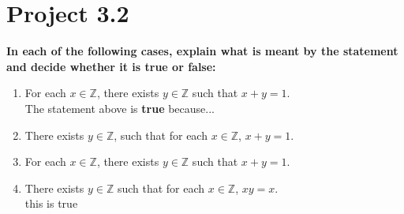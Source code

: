 \documentclass{article}
\begin{document}
\section{Project 3.2}
\textbf{In each of the following cases, explain what is meant by the statement and decide whether it is true or false:}
\begin{enumerate}
    \item For each $x \in \mathbb{Z}$, there exists $y \in \mathbb{Z}$ such that $x + y = 1$.\\
    The statement above is \textbf{true} because...
    \item There exists $y \in \mathbb{Z}$, such that for each $x \in \mathbb{Z}$, $x + y = 1$.\\
    \item For each $x \in \mathbb{Z}$, there exists $y \in \mathbb{Z}$ such that $x + y = 1$.\\
    \item There exists $y \in \mathbb{Z}$ such that for each $x \in \mathbb{Z}$, $xy = x$.\\
    this is true
\end{enumerate}
\end{document}
